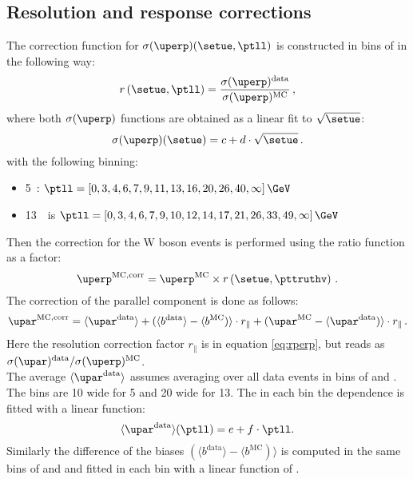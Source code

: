      \subsection{Resolution and response corrections}
     The correction function for $\sigma(\uperp)(\setue,\ptll)$ is constructed in bins of \ptll in the following way:
     \begin{equation}
     \label{eq:rperp}
     r\left(\setue,\ptll\right) = \frac{\sigma(\uperp)^\mathrm{data}
     }{\sigma(\uperp)^\mathrm{MC}}\,,
     \end{equation}
     where both $\sigma(\uperp)$ functions are obtained as a linear fit to $\sqrt{\setue}$:
     \begin{equation}
     \sigma(\uperp) (\setue) = c + d\cdot\sqrt{\setue}\,.
     \label{eqn:fitfunc_sigma}
     \end{equation}
     with the following \ptll binning:
     \begin{itemize}
     	\item 5~\TeV: $\ptll = [ 0, 3, 4, 6, 7, 9, 11, 13, 16, 20, 26, 40, \infty] \,\GeV$
     	\item 13~\TeV\ is $\ptll = [ 0, 3, 4, 6, 7, 9, 10, 12, 14, 17, 21, 26, 33, 49, \infty]\,\GeV$
     \end{itemize}
 	Then the correction for the W boson events is performed using the ratio function as a factor:
 	\begin{equation}
 	\uperp^{\mathrm{MC,corr}} = \uperp^{\mathrm{MC}} \times
 	r\left(\setue,\pttruthv\right)\,.
 	\end{equation}
 	The correction of the parallel component \upar is done as follows:
 	\begin{equation}
 	\upar^\mathrm{MC, corr} = \langle{\upar^\mathrm{data}}\rangle +
 	(\langle{b^\mathrm{data}}\rangle - \langle{b^\mathrm{MC}})\rangle\cdot r_{\parallel} + (\upar^\mathrm{MC} -
 	\langle{\upar^\mathrm{data}})\rangle\cdot r_{\parallel}\,.
 	\label{eq:uparcor}
 	\end{equation}
 	Here the resolution correction factor $r_{\parallel}$ is in equation \ref{eq:rperp}, but reads as $ \sigma(\upar)^\mathrm{data}/\sigma(\uperp)^\mathrm{MC}$. \\
 	The average $\langle{\upar^\mathrm{data}}\rangle$ assumes averaging over all data events in bins of \ptll and \setue. The \setue bins are 10\gev{} wide for 5\tev{} and 20\gev{} wide for 13\tev{}. The in each \setue bin the \ptll dependence is fitted with a linear function: 
 	  \begin{equation}
 	\langle{\upar^\mathrm{data}}\rangle(\ptll) = e + f\cdot\ptll.
 	\label{eqn:fitfunc_upar}
 	\end{equation}  
 	Similarly the difference of the biases $(\langle{b^\mathrm{data}}\rangle - \langle{b^\mathrm{MC}})\rangle$ is computed in the same bins of \ptll and \setue and fitted in each \setue bin with a linear function of \ptll.


